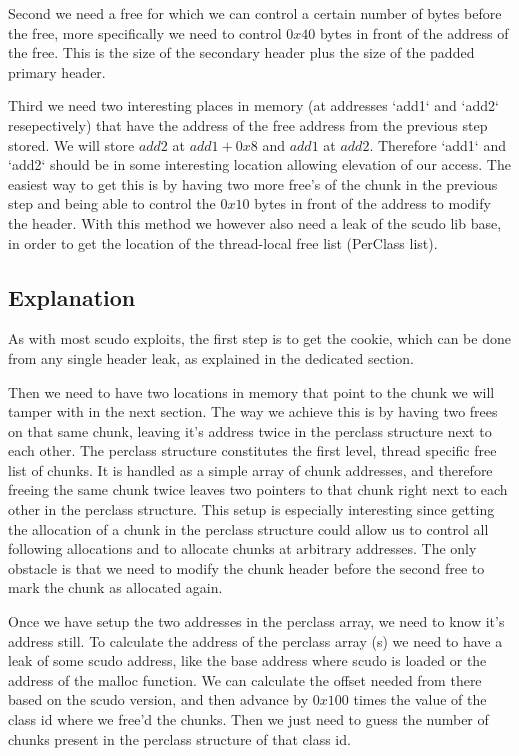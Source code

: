 \documentclass[a4paper,11pt,oneside]{report}
\begin{document}
Second we need a free for which we can control a certain number of bytes before the free, more specifically we need to control $0x40$ bytes in front of the address of the free. This is the size of the secondary header plus the size of the padded primary header.

Third we need two interesting places in memory (at addresses `add1` and `add2` resepectively) that have the address of the free address from the previous step stored. We will store $add2$ at $add1+0x8$ and $add1$ at $add2$. Therefore `add1` and `add2` should be in some interesting location allowing elevation of our access.  
The easiest way to get this is by having two more free's of the chunk in the previous step and being able to control the $0x10$ bytes in front of the address to modify the header. With this method we however also need a leak of the scudo lib base, in order to get the location of the thread-local free list (PerClass list).

\subsection{Explanation}

As with most scudo exploits, the first step is to get the cookie, which can be done from any single header leak, as explained in the dedicated section.

Then we need to have two locations in memory that point to the chunk we will tamper with in the next section. The way we achieve this is by having two frees on that same chunk, leaving it's address twice in the perclass structure next to each other. The perclass structure constitutes the first level, thread specific free list of chunks. It is handled as a simple array of chunk addresses, and therefore freeing the same chunk twice leaves two pointers to that chunk right next to each other in the perclass structure. This setup is especially interesting since getting the allocation of a chunk in the perclass structure could allow us to control all following allocations and to allocate chunks at arbitrary addresses. The only obstacle is that we need to modify the chunk header before the second free to mark the chunk as allocated again.

Once we have setup the two addresses in the perclass array, we need to know it's address still. To calculate the address of the perclass array (s) we need to have a leak of some scudo address, like the base address where scudo is loaded or the address of the malloc function. We can calculate the offset needed from there based on the scudo version, and then advance by $0x100$ times the value of the class id where we free'd the chunks. Then we just need to guess the number of chunks present in the perclass structure of that class id.
\end{document}
